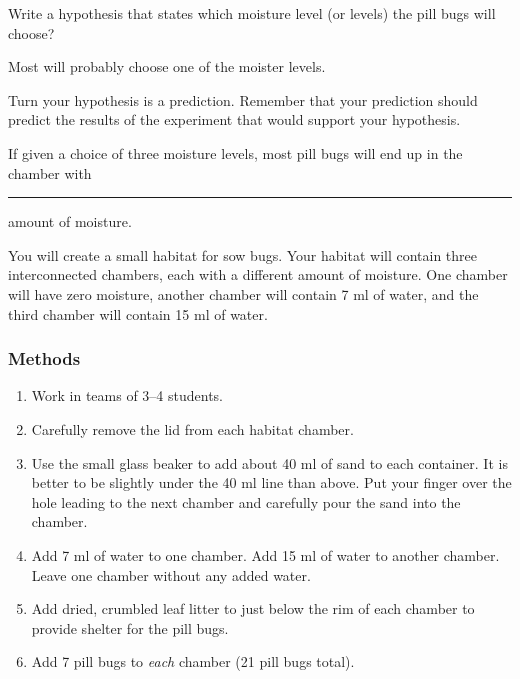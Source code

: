 \documentclass[12pt, hidelinks]{exam}
\newcommand*\AnswerBox[2]{%
    \parbox[t][#1]{0.92\textwidth}{%
    \begin{solution}#2\end{solution}}
    \vspace{\stretch{1}}
}
\newlength{\basespace}
\begin{document}
\begin{questions}

\question \label{ques:hypothesis}
Write a hypothesis that states which moisture level (or levels) the pill bugs will choose?

\AnswerBox{0.35\basespace}{Most will probably choose one of the moister levels.}


\question
Turn your hypothesis is a prediction. Remember that your prediction should predict the results of the experiment that would support your hypothesis. 

\AnswerBox{0.35\basespace}{%
	If given a choice of three moisture levels, most pill bugs will end up in the chamber with \rule{0.75in}{0.4pt} amount of moisture.
}

You will create a small habitat for sow bugs.  Your habitat will contain three interconnected chambers, each with a different amount of moisture.  One chamber will have zero moisture, another chamber will contain 7 ml of water, and the third chamber will contain 15 ml of water.


\subsubsection*{Methods}

\begin{enumerate}
	
	\item Work in teams of 3–4 students.
	
	\item Carefully remove the lid from each habitat chamber. 
	
	\item Use the small glass beaker to add about 40 ml of sand to each container. It is better to be slightly under the 40 ml line than above. Put your finger over the hole leading to the next chamber and carefully pour the sand into the chamber.
	
	\item Add 7 ml of water to one chamber. Add 15 ml of water to another chamber. Leave one chamber without any added water.
	
	\item Add dried, crumbled leaf litter to just below the rim of each chamber to provide shelter for the pill bugs.
	
	\item Add 7 pill bugs to \emph{each} chamber (21 pill bugs total). %
	

\end{enumerate}
\end{questions}
\end{document}
